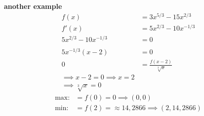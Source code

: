 \documentclass{book}
\begin{document}
\begin{multicols}{2}
\textbf{another example}\\
\begin{align*}
  f(x)&=3x^{5/3}-15x^{2/3}\\ 
  f'(x)&=5x^{2/3}-10x^{-1/3}\\
  5x^{2/3}-10x^{-1/3}&=0\\\\
  5x^{-1/3}(x-2)&=0\\
  0&=\frac{f(x-2)}{\sqrt[3]{x}}\\
  \implies x-2=0 \implies x=2\\
  \implies \sqrt[3]{x}=0
\end{align*}
\begin{align*}
  \text{max:} &=f(0)=0 \implies (0,0)\\
  \text{min:} &=f(2)=\approx 14,2866 \implies (2,14,2866)\\
\end{align*}
\end{multicols}
\end{document}
